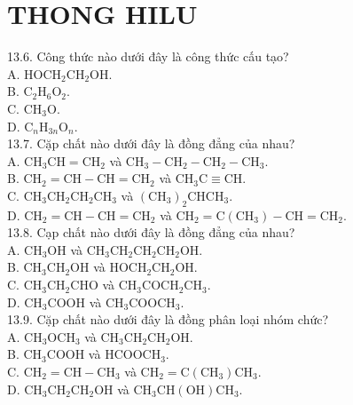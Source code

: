 \documentclass[10pt]{article}
\begin{document}
\section*{THONG HILU}
13.6. Công thức nào dưới đây là công thức cấu tạo?\\
A. $\mathrm{HOCH}_{2} \mathrm{CH}_{2} \mathrm{OH}$.\\
B. $\mathrm{C}_{2} \mathrm{H}_{6} \mathrm{O}_{2}$.\\
C. $\mathrm{CH}_{3} \mathrm{O}$.\\
D. $\mathrm{C}_{n} \mathrm{H}_{3 n} \mathrm{O}_{n}$.\\
13.7. Cặp chất nào dưới đây là đồng đẳng của nhau?\\
A. $\mathrm{CH}_{3} \mathrm{CH}=\mathrm{CH}_{2}$ và $\mathrm{CH}_{3}-\mathrm{CH}_{2}-\mathrm{CH}_{2}-\mathrm{CH}_{3}$.\\
B. $\mathrm{CH}_{2}=\mathrm{CH}-\mathrm{CH}=\mathrm{CH}_{2}$ và $\mathrm{CH}_{3} \mathrm{C} \equiv \mathrm{CH}$.\\
C. $\mathrm{CH}_{3} \mathrm{CH}_{2} \mathrm{CH}_{2} \mathrm{CH}_{3}$ và $\left(\mathrm{CH}_{3}\right)_{2} \mathrm{CHCH}_{3}$.\\
D. $\mathrm{CH}_{2}=\mathrm{CH}-\mathrm{CH}=\mathrm{CH}_{2}$ và $\mathrm{CH}_{2}=\mathrm{C}\left(\mathrm{CH}_{3}\right)-\mathrm{CH}=\mathrm{CH}_{2}$.\\
13.8. Cạp chất nào dưới đây là đồng đẳng của nhau?\\
A. $\mathrm{CH}_{3} \mathrm{OH}$ và $\mathrm{CH}_{3} \mathrm{CH}_{2} \mathrm{CH}_{2} \mathrm{CH}_{2} \mathrm{OH}$.\\
B. $\mathrm{CH}_{3} \mathrm{CH}_{2} \mathrm{OH}$ và $\mathrm{HOCH}_{2} \mathrm{CH}_{2} \mathrm{OH}$.\\
C. $\mathrm{CH}_{3} \mathrm{CH}_{2} \mathrm{CHO}$ và $\mathrm{CH}_{3} \mathrm{COCH}_{2} \mathrm{CH}_{3}$.\\
D. $\mathrm{CH}_{3} \mathrm{COOH}$ và $\mathrm{CH}_{3} \mathrm{COOCH}_{3}$.\\
13.9. Cặp chất nào dưới đây là đồng phân loại nhóm chức?\\
A. $\mathrm{CH}_{3} \mathrm{OCH}_{3}$ và $\mathrm{CH}_{3} \mathrm{CH}_{2} \mathrm{CH}_{2} \mathrm{OH}$.\\
B. $\mathrm{CH}_{3} \mathrm{COOH}$ và $\mathrm{HCOOCH}_{3}$.\\
C. $\mathrm{CH}_{2}=\mathrm{CH}-\mathrm{CH}_{3}$ và $\mathrm{CH}_{2}=\mathrm{C}\left(\mathrm{CH}_{3}\right) \mathrm{CH}_{3}$.\\
D. $\mathrm{CH}_{3} \mathrm{CH}_{2} \mathrm{CH}_{2} \mathrm{OH}$ và $\mathrm{CH}_{3} \mathrm{CH}(\mathrm{OH}) \mathrm{CH}_{3}$.\\
\end{document}
